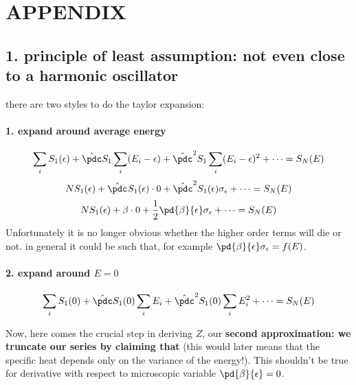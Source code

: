 \section{APPENDIX}
        \subsection{1. principle of least assumption: not even close to a harmonic oscillator}
        there are two styles to do the taylor expansion:
        
        \paragraph{1. expand around average energy \aE}
        \[ \soi S_1(\aE) +  \hat\pdc S_1 \soi(E_i-\aE) +  {\hat\pdc}^2 S_1 \soi (E_i-\aE)^2 + \cdots  = S_N(E) \]
        \[ NS_1(\aE) + \Stothei{} \cdot 0 + \Stothei{2}\sigma_\aE + \cdots = S_N(E)   \]
        \[ NS_1(\aE) + \beta \cdot 0 + \frac12\pd{\beta}{\aE}\sigma_\aE + \cdots = S_N(E)   \]
        Unfortunately it is no longer obvious whether the higher order terms will die or not. in general it could be such that, for example $ \pd{\beta}{\aE}\sigma_\aE = f(E)$.

        \paragraph{2. expand around $E=0$}
        \[ \soi S_1(0) +  \hat\pdc S_1(0) \soi E_i +  {\hat\pdc}^2 S_1(0) \soi E_i^2 + \cdots  = S_N(E) \]

         Now, here comes the crucial step in deriving $Z$, our \textbf{ second approximation: we truncate our series by claiming that  }(this would later means that the specific heat depends only on the variance of the energy!). This shouldn't be true for derivative with respect to microscopic variable $\pd{\beta}{\aE}=0$.


